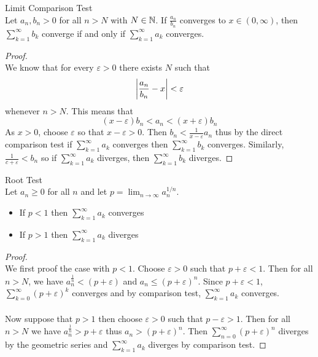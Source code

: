 \documentclass[a4paper]{article}
\begin{document}
\begin{thm}{Limit Comparison Test}{}\\ Let $a_n, b_n>0$ for all $n>N$ with $N\in\mathbb{N}$. If $\frac{a_n}{b_n}$ converges to $x\in(0,\infty)$, then $\sum_{k=1}^\infty b_k$ converge if and only if $\sum_{k=1}^\infty a_k$ converges. 
\begin{proof}\\ We know that for every $\varepsilon>0$ there exists $N$ such that $$\abs{\frac{a_n}{b_n}-x}<\varepsilon$$ whenever $n>N$. This means that $$(x-\varepsilon)b_n<a_n<(x+\varepsilon)b_n$$ As $x>0$, choose $\varepsilon$ so that $x-\varepsilon>0$. Then $b_n<\frac{1}{x-\varepsilon}a_n$ thus by the direct comparison test if $\sum_{k=1}^\infty a_k$ converges then $\sum_{k=1}^\infty b_k$ converges. Similarly, $\frac{1}{c+\varepsilon}<b_n$ so if $\sum_{k=1}^\infty a_k$ diverges, then $\sum_{k=1}^\infty b_k$ diverges. 
\end{proof}
\end{thm}

\begin{thm}{Root Test}{}\\ Let $a_n\geq0$ for all $n$ and let $p=\lim_{n\to\infty}a_n^{1/n}$. 
\begin{itemize}
\item If $p<1$ then $\sum_{k=1}^\infty a_k$ converges
\item If $p>1$ then $\sum_{k=1}^\infty a_k$ diverges
\end{itemize} 
\begin{proof}\\ We first proof the case with $p<1$. Choose $\varepsilon>0$ such that $p+\varepsilon<1$. Then for all $n>N$, we have $a_n^\frac{1}{n}<(p+\varepsilon)$ and $a_n\leq(p+\varepsilon)^n$. Since $p+\varepsilon<1$, $\sum_{k=0}^{\infty}(p+\varepsilon)^k$ converges and by comparison test, $\sum_{k=1}^\infty a_k$ converges. \\~\\
Now suppose that $p>1$ then choose $\varepsilon>0$ such that $p-\varepsilon>1$. Then for all $n>N$ we have $a_n^\frac{1}{n}>p+\varepsilon$ thus $a_n>(p+\varepsilon)^n$. Then $\sum_{n=0}^{\infty}(p+\varepsilon)^n$ diverges by the geometric series and $\sum_{k=1}^\infty a_k$ diverges by comparison test. 
\end{proof}
\end{thm}
\end{document}
